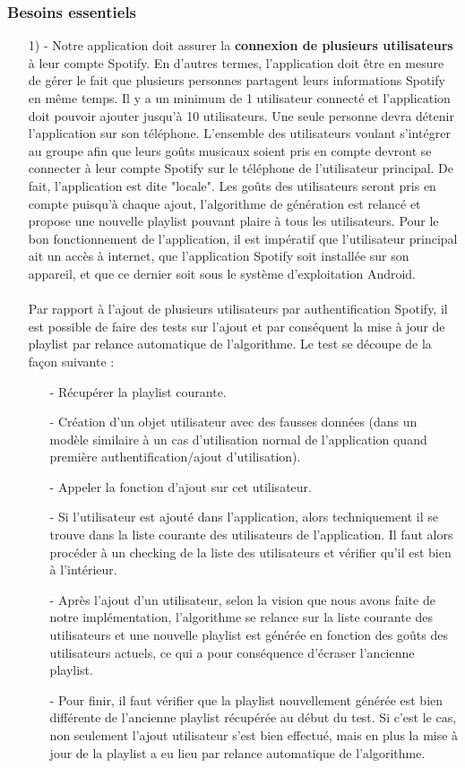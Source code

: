 \documentclass[12pt, openany]{report}
\begin{document}
\subsubsection{Besoins essentiels}
\begin{itemize}
\item[1) -] Notre application doit assurer la \textbf{connexion de plusieurs utilisateurs} à leur compte Spotify. En d'autres termes, l'application doit être en mesure de gérer le fait que plusieurs personnes partagent leurs informations Spotify en même temps. Il y a un minimum de 1 utilisateur connecté et l'application doit pouvoir ajouter jusqu'à 10 utilisateurs. Une seule personne devra détenir l'application sur son téléphone. L'ensemble des utilisateurs voulant s'intégrer au groupe afin que leurs goûts musicaux soient pris en compte devront se connecter à leur compte Spotify sur le téléphone de l'utilisateur principal. De fait, l'application est dite "locale". Les goûts des utilisateurs seront pris en compte puisqu'à chaque ajout, l'algorithme de génération est relancé et propose une nouvelle playlist pouvant plaire à tous les utilisateurs. Pour le bon fonctionnement de l'application, il est impératif que l'utilisateur principal ait un accès à internet, que l'application Spotify soit installée sur son appareil, et que ce dernier soit sous le système d'exploitation Android.
\\
\\
Par rapport à l'ajout de plusieurs utilisateurs par authentification Spotify, il est possible de faire des tests sur l'ajout et par conséquent la mise à jour de playlist par relance automatique de l'algorithme. Le test se découpe de la façon suivante :
\begin{itemize}
\item[-] Récupérer la playlist courante.
\item[-] Création d'un objet utilisateur avec des fausses données (dans un modèle similaire à un cas d'utilisation normal de l'application quand première authentification/ajout d'utilisation).
\item[-] Appeler la fonction d'ajout sur cet utilisateur.
\item[-] Si l'utilisateur est ajouté dans l'application, alors techniquement il se trouve dans la liste courante des utilisateurs de l'application. Il faut alors procéder à un checking de la liste des utilisateurs et vérifier qu'il est bien à l'intérieur.
\item[-] Après l'ajout d'un utilisateur, selon la vision que nous avons faite de notre implémentation, l'algorithme se relance sur la liste courante des utilisateurs et une nouvelle playlist est générée en fonction des goûts des utilisateurs actuels, ce qui a pour conséquence d'écraser l'ancienne playlist.
\item[-] Pour finir, il faut vérifier que la playlist nouvellement générée est bien différente de l'ancienne playlist récupérée au début du test. Si c'est le cas, non seulement l'ajout utilisateur s'est bien effectué, mais en plus la mise à jour de la playlist a eu lieu par relance automatique de l'algorithme.
\\
\end{itemize}


\end{itemize}
\end{document}
